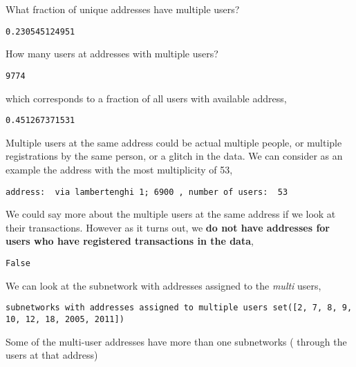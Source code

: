 \documentclass{report}
\begin{document}
    What fraction of unique addresses have multiple users?


    \begin{Verbatim}[commandchars=\\\{\}]
0.230545124951
    \end{Verbatim}

    How many users at addresses with multiple users?


    \begin{Verbatim}[commandchars=\\\{\}]
9774
    \end{Verbatim}

    which corresponds to a fraction of all users with available address,


    \begin{Verbatim}[commandchars=\\\{\}]
0.451267371531
    \end{Verbatim}

    Multiple users at the same address could be actual multiple people, or
multiple registrations by the same person, or a glitch in the data. We
can consider as an example the address with the most multiplicity of 53,


    \begin{Verbatim}[commandchars=\\\{\}]
address:  via lambertenghi 1; 6900 , number of users:  53
    \end{Verbatim}

    We could say more about the multiple users at the same address if we
look at their transactions. However as it turns out, we \textbf{do not
have addresses for users who have registered transactions in the data},


    \begin{Verbatim}[commandchars=\\\{\}]
False
    \end{Verbatim}

    We can look at the subnetwork with addresses assigned to the
\emph{multi} users,


    \begin{Verbatim}[commandchars=\\\{\}]
subnetworks with addresses assigned to multiple users set([2, 7, 8, 9, 10, 12, 18, 2005, 2011])
    \end{Verbatim}

    Some of the multi-user addresses have more than one subnetworks (
through the users at that address)
\end{document}
